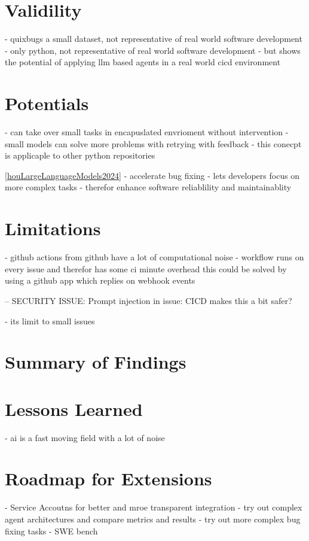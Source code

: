 \section{Validility}
- quixbugs a small dataset, not representative of real world software development
- only python, not representative of real world software development
- but shows the potential of applying llm based agents in a real world cicd environment

\section{Potentials}
- can take over small tasks in encapuslated envrioment without intervention
- small models can solve more problems with retrying with feedback
- this conecpt is applicaple to other python repositories

\ref{houLargeLanguageModels2024}
- accelerate bug fixing
- lets developers focus on more complex tasks
- therefor enhance software reliablility and maintainablity

\section{Limitations}
- github actions from github have a lot of computational noise
- workflow runs on every issue and therefor has some ci minute overhead this could be solved by using a github app which replies on webhook events

-- SECURITY ISSUE: Prompt injection in issue: CICD makes this a bit safer?

- its limit to small issues

\section{Summary of Findings}
\section{Lessons Learned}
- ai is a fast moving field with a lot of noise


\section{Roadmap for Extensions}
- Service Accoutns for better and mroe transparent integration
- try out complex agent architectures and compare metrics and results
- try out more complex bug fixing tasks - SWE bench
